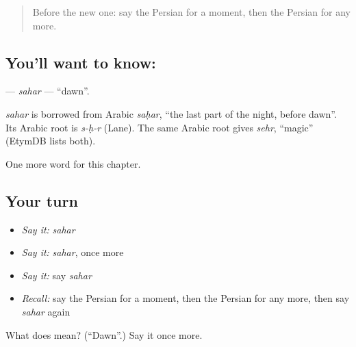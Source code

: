 \label{lesson:FA-C229-sahar}



\begin{quote}
Before the new one: say the Persian for a moment, then the Persian for any more.
\end{quote}

\subsection*{You'll want to know: }
\textbf{} — \emph{sahar} — \textquotedblleft{}dawn\textquotedblright{}.

\begin{cousinweb}
\emph{sahar} is borrowed from Arabic \emph{saḥar}, \textquotedblleft{}the last part of the night, before dawn\textquotedblright{}. Its Arabic root is \emph{s-ḥ-r} (Lane). The same Arabic root gives \emph{sehr}, \textquotedblleft{}magic\textquotedblright{} (EtymDB lists both).
\end{cousinweb}

\begin{grammarlens}[title={What you've built}]
One more word for this chapter.
\end{grammarlens}

\subsection*{Your turn}
\begin{itemize}
\raggedright
  \item \emph{Say it:} \emph{sahar}
  \item \emph{Say it:} \emph{sahar}, once more
  \item \emph{Say it:} say \emph{sahar}
  \item \emph{Recall:} say the Persian for a moment, then the Persian for any more, then say \emph{sahar} again
\end{itemize}

\begin{tcolorbox}[breakable,colback=teal!4,colframe=teal!35!black,title={Before you move on}]
What does  mean? (\textquotedblleft{}Dawn\textquotedblright{}.) Say it once more.
\end{tcolorbox}
